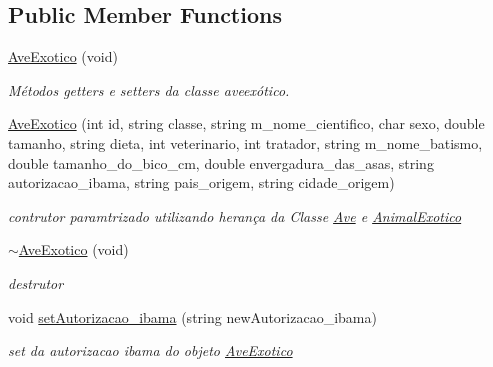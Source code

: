 \subsection*{Public Member Functions}
\begin{DoxyCompactItemize}
\item 
\mbox{\label{class_ave_exotico_af3e816b4164e2647d88c90dd4b901df2}} 
\mbox{\hyperlink{class_ave_exotico_af3e816b4164e2647d88c90dd4b901df2}{Ave\+Exotico}} (void)
\begin{DoxyCompactList}\small\item\em Métodos getters e setters da classe aveexótico. \end{DoxyCompactList}\item 
\mbox{\label{class_ave_exotico_a1c86ecc6b5f45f6bdc18a037db89cef7}} 
\mbox{\hyperlink{class_ave_exotico_a1c86ecc6b5f45f6bdc18a037db89cef7}{Ave\+Exotico}} (int id, string classe, string m\+\_\+nome\+\_\+cientifico, char sexo, double tamanho, string dieta, int veterinario, int tratador, string m\+\_\+nome\+\_\+batismo, double tamanho\+\_\+do\+\_\+bico\+\_\+cm, double envergadura\+\_\+das\+\_\+asas, string autorizacao\+\_\+ibama, string pais\+\_\+origem, string cidade\+\_\+origem)
\begin{DoxyCompactList}\small\item\em contrutor paramtrizado utilizando herança da Classe \mbox{\hyperlink{class_ave}{Ave}} e \mbox{\hyperlink{class_animal_exotico}{Animal\+Exotico}} \end{DoxyCompactList}\item 
\mbox{\label{class_ave_exotico_aa26277e686e4a4fe8a3ce7f503c82295}} 
\mbox{\hyperlink{class_ave_exotico_aa26277e686e4a4fe8a3ce7f503c82295}{$\sim$\+Ave\+Exotico}} (void)
\begin{DoxyCompactList}\small\item\em destrutor \end{DoxyCompactList}\item 
void \mbox{\hyperlink{class_ave_exotico_acdc5422c3b3ecf2bc243a90ca290d9c5}{set\+Autorizacao\+\_\+ibama}} (string new\+Autorizacao\+\_\+ibama)
\begin{DoxyCompactList}\small\item\em set da autorizacao ibama do objeto \mbox{\hyperlink{class_ave_exotico}{Ave\+Exotico}} \end{DoxyCompactList}\item 

\end{DoxyCompactItemize}

